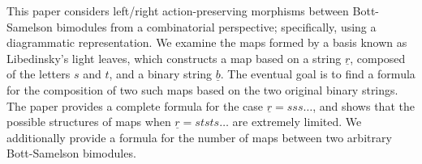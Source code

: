 
This paper considers left/right action-preserving morphisms between Bott-Samelson bimodules from a combinatorial perspective; specifically, using a diagrammatic representation.  We examine the maps formed by a basis known as Libedinsky's light leaves, which constructs a map based on a string $\underline r$, composed of the letters $s$ and $t$, and a binary string $\underline b$.  The eventual goal is to find a formula for the composition of two such maps based on the two original binary strings.  The paper provides a complete formula for the case $\underline r = sss\dots$, and shows that the possible structures of maps when $\underline r = ststs\dots$ are extremely limited.  We additionally provide a formula for the number of maps between two arbitrary Bott-Samelson bimodules.
